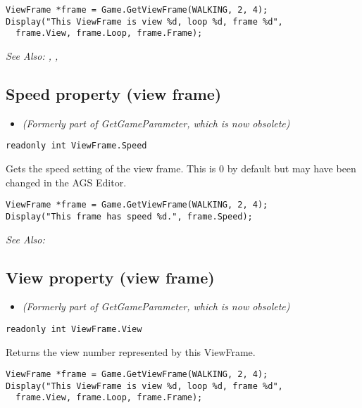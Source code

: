 \begin{verbatim}
ViewFrame *frame = Game.GetViewFrame(WALKING, 2, 4);
Display("This ViewFrame is view %d, loop %d, frame %d",
  frame.View, frame.Loop, frame.Frame);
\end{verbatim}

\it{See Also:} ,
,


\subsection{Speed property (view frame)}\label{ViewFrame.Speed}%

\begin{itemize}
\item \it{(Formerly part of GetGameParameter, which is now obsolete)}
\end{itemize}

\begin{verbatim}
readonly int ViewFrame.Speed
\end{verbatim}
Gets the speed setting of the view frame. This is 0 by default but may have been changed
in the AGS Editor.

\begin{verbatim}
ViewFrame *frame = Game.GetViewFrame(WALKING, 2, 4);
Display("This frame has speed %d.", frame.Speed);
\end{verbatim}

\it{See Also:} 


\subsection{View property (view frame)}\label{ViewFrame.View}%

\begin{itemize}
\item \it{(Formerly part of GetGameParameter, which is now obsolete)}
\end{itemize}

\begin{verbatim}
readonly int ViewFrame.View
\end{verbatim}
Returns the view number represented by this ViewFrame.

\begin{verbatim}
ViewFrame *frame = Game.GetViewFrame(WALKING, 2, 4);
Display("This ViewFrame is view %d, loop %d, frame %d",
  frame.View, frame.Loop, frame.Frame);
\end{verbatim}


